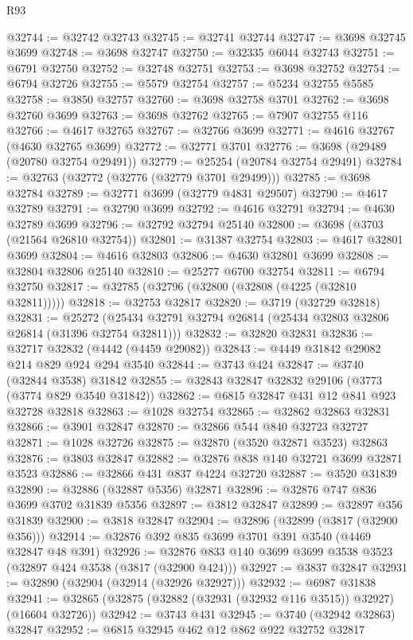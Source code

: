 \begin{lexlean}{R93}
\begin{coremodule}
@32744 := @32742 @32743
@32745 := @32741 @32744
@32747 := @3698 @32745 @3699
@32748 := @3698 @32747
@32750 := @32335 @6044 @32743
@32751 := @6791 @32750
@32752 := @32748 @32751
@32753 := @3698 @32752
@32754 := @6794 @32726
@32755 := @5579 @32754
@32757 := @5234 @32755 @5585
@32758 := @3850 @32757
@32760 := @3698 @32758 @3701
@32762 := @3698 @32760 @3699
@32763 := @3698 @32762
@32765 := @7907 @32755 @116
@32766 := @4617 @32765
@32767 := @32766 @3699
@32771 := @4616 @32767 (@4630 @32765 @3699)
@32772 := @32771 @3701
@32776 := @3698 (@29489 (@20780 @32754 @29491))
@32779 := @25254 (@20784 @32754 @29491)
@32784 := @32763 (@32772 (@32776 (@32779 @3701 @29499)))
@32785 := @3698 @32784
@32789 := @32771 @3699 (@32779 @4831 @29507)
@32790 := @4617 @32789
@32791 := @32790 @3699
@32792 := @4616 @32791
@32794 := @4630 @32789 @3699
@32796 := @32792 @32794 @25140
@32800 := @3698 (@3703 (@21564 @26810 @32754))
@32801 := @31387 @32754
@32803 := @4617 @32801 @3699
@32804 := @4616 @32803
@32806 := @4630 @32801 @3699
@32808 := @32804 @32806 @25140
@32810 := @25277 @6700 @32754
@32811 := @6794 @32750
@32817 := @32785 (@32796 (@32800 (@32808 (@4225 (@32810 @32811)))))
@32818 := @32753 @32817
@32820 := @3719 (@32729 @32818)
@32831 := @25272 (@25434 @32791 @32794 @26814 (@25434 @32803 @32806 @26814 (@31396 @32754 @32811)))
@32832 := @32820 @32831
@32836 := @32717 @32832 (@4442 (@4459 @29082))
@32843 := @4449 @31842 @29082 @214 @829 @924 @294 @3540
@32844 := @3743 @424
@32847 := @3740 (@32844 @3538) @31842
@32855 := @32843 @32847 @32832 @29106 (@3773 (@3774 @829 @3540 @31842))
@32862 := @6815 @32847 @431 @12 @841 @923 @32728 @32818
@32863 := @1028 @32754
@32865 := @32862 @32863 @32831
@32866 := @3901 @32847
@32870 := @32866 @544 @840 @32723 @32727
@32871 := @1028 @32726
@32875 := @32870 (@3520 @32871 @3523) @32863
@32876 := @3803 @32847
@32882 := @32876 @838 @140 @32721 @3699 @32871 @3523
@32886 := @32866 @431 @837 @4224 @32720
@32887 := @3520 @31839
@32890 := @32886 (@32887 @5356) @32871
@32896 := @32876 @747 @836 @3699 @3702 @31839 @5356
@32897 := @3812 @32847
@32899 := @32897 @356 @31839
@32900 := @3818 @32847
@32904 := @32896 (@32899 (@3817 (@32900 @356)))
@32914 := @32876 @392 @835 @3699 @3701 @391 @3540 (@4469 @32847 @48 @391)
@32926 := @32876 @833 @140 @3699 @3699 @3538 @3523 (@32897 @424 @3538 (@3817 (@32900 @424)))
@32927 := @3837 @32847
@32931 := @32890 (@32904 (@32914 (@32926 @32927)))
@32932 := @6987 @31838
@32941 := @32865 (@32875 (@32882 (@32931 (@32932 @116 @3515)) @32927) (@16604 @32726))
@32942 := @3743 @431
@32945 := @3740 (@32942 @32863) @32847
@32952 := @6815 @32945 @462 @12 @862 @922 @32752 @32817

\end{coremodule}
\end{lexlean}
